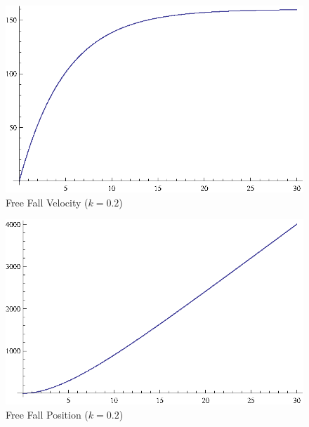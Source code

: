 \documentclass{exam}
\begin{document}
  \begin{figure}[h]
    \centering
    \includegraphics[scale=0.9]{freeFallVelocity.eps}
    \caption{Free Fall Velocity ($k = 0.2$)}
  \end{figure}

  \begin{figure}[h]
    \centering
    \includegraphics[scale=0.9]{freeFallPosition.eps}
    \caption{Free Fall Position ($k = 0.2$)}
  \end{figure}
\end{document}
